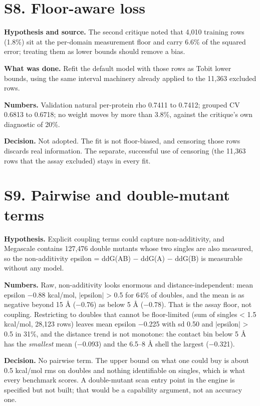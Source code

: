 \documentclass[11pt,a4paper]{article}
\begin{document}
\section{S8. Floor-aware loss}

\textbf{Hypothesis and source.} The second critique noted that 4,010 training rows (1.8\%) sit at the per-domain
measurement floor and carry 6.6\% of the squared error; treating them as lower bounds should remove a bias.

\textbf{What was done.} Refit the default model with those rows as Tobit lower bounds, using the same interval
machinery already applied to the 11,363 excluded rows.

\textbf{Numbers.} Validation natural per-protein rho 0.7411 to 0.7412; grouped CV 0.6813 to 0.6718; no weight moves
by more than 3.8\%, against the critique's own diagnostic of 20\%.

\textbf{Decision.} Not adopted. The fit is not floor-biased, and censoring those rows discards real information.
The separate, successful use of censoring (the 11,363 rows that the assay excluded) stays in every fit.



\section{S9. Pairwise and double-mutant terms}

\textbf{Hypothesis.} Explicit coupling terms could capture non-additivity, and Megascale contains 127,476 double
mutants whose two singles are also measured, so the non-additivity epsilon = ddG(AB) $-$ ddG(A) $-$ ddG(B) is
measurable without any model.

\textbf{Numbers.} Raw, non-additivity looks enormous and distance-independent: mean epsilon $-$0.88 kcal/mol, $|$epsilon$|$
> 0.5 for 64\% of doubles, and the mean is as negative beyond 15 \AA{} ($-$0.76) as below 5 \AA{} ($-$0.78). That is the assay
floor, not coupling. Restricting to doubles that cannot be floor-limited (sum of singles < 1.5 kcal/mol,
28,123 rows) leaves mean epsilon $-$0.225 with sd 0.50 and $|$epsilon$|$ > 0.5 in 31\%, and the distance trend is not
monotone: the contact bin below 5 \AA{} has the \emph{smallest} mean ($-$0.093) and the 6.5--8 \AA{} shell the largest ($-$0.321).

\textbf{Decision.} No pairwise term. The upper bound on what one could buy is about 0.5 kcal/mol rms on doubles and
nothing identifiable on singles, which is what every benchmark scores. A double-mutant scan entry point in the
engine is specified but not built; that would be a capability argument, not an accuracy one.
\end{document}
